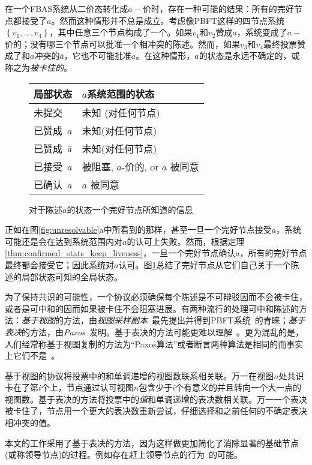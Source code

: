 在一个FBAS系统从二价态转化成$a-\!\!$价时，存在一种可能的结果：所有的完好节点都接受了$a$。然而这种情形并不总是成立。考虑像PBFT这样的四节点系统$\left\{v_1,\ldots,v_4\right\}$，其中任意三个节点构成了一个{\quorum}。如果$v_1$和$v_2$赞成$a$，系统变成了$a-\!\!$价的；没有哪三个节点可以批准一个相冲突的陈述。然而，如果$v_3$和$v_4$最终投票赞成了和$a$冲突的$\bar a$，它也不可能批准$a$。在这种情形，$a$的状态是永远不确定的，或称之为\textit{被卡住的}。

\begin{figure}
\centering 
{}
\begin{tabu} to .85\textwidth{ll}\toprule
\rowfont\bfseries 局部状态 & $a$系统范围的状态\\
\midrule
未提交 & 未知 (对任何节点) \\
已赞成~$a$ & 未知(对任何节点) \\
已赞成~$\bar a$ & 未知(对任何节点) \\
已接受~$a$ & 被阻塞, $a$-价的, or $a$ 被同意 \\
已确认~$a$ & $a$ 被同意 \\
\bottomrule
\end{tabu}
\caption{对于陈述$a$的状态一个完好节点所知道的信息}
\label{fig:localglobal}
\end{figure}

正如在{图\ref{fig:unresolvable}a}中所看到的那样，甚至一旦一个完好节点接受$a$，系统可能还是会在达到系统范围内对$a$的认可上失败。然而，根据定理\ref{thm:confirmed_stats_keep_liveness}，一旦一个完好节点确认$a$，所有的完好节点最终都会接受它；因此系统对$a$认可。{图\ref{fig:localglobal}}总结了完好节点从它们自己关于一个陈述的局部状态可知的全局状态。

为了保持共识的可能性，一个协议必须确保每个陈述是不可辩驳因而不会被卡住，或者是可中和的因而如果被卡住不会阻塞进展。有两种流行的处理可中和陈述的方法：\textit{基于视图}的方法，由\textit{视图采样副本}~最先提出并得到PBFT系统~的青睐；\textit{基于表决}的方法，由\textit{Paxos}~发明。基于表决的方法可能更难以理解~。更为混乱的是，人们经常称基于视图复制的方法为``Paxos算法''或者断言两种算法是相同的而事实上它们不是~。

基于视图的协议将投票中的{\slot}和单调递增的视图数联系相关联。万一在视图$n$处共识卡在了第$i$个{\slot}上，节点通过认可视图$n$包含少于$i$个有意义的{\slot}并且转向一个大一点的视图数。基于表决的方法将投票中的\textit{值}和单调递增的表决数相关联。万一一个表决被卡住了，节点用一个更大的表决数重新尝试，仔细选择和之前任何的不确定表决相冲突的值。

本文的工作采用了基于表决的方法，因为这样做更加简化了消除显著的基础节点(或称领导节点)的过程。例如存在赶上领导节点的行为~的可能。
